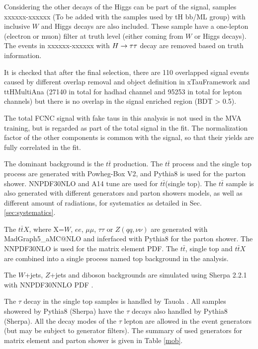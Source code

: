 Considering the other decays of the Higgs can be part of the signal, samples xxxxxx-xxxxxx (To be added with the samples used by tH bb/ML group) with inclusive $W$ and Higgs decays are also included. These sample have a one-lepton (electron or muon) filter at truth level (either coming from $W$ or Higgs decays). The events in xxxxxx-xxxxxx with $H \rightarrow \tau\tau$ decay are removed based on truth information.

It is checked that after the final selection, there are 110 overlapped signal events caused by different overlap removal and object definition in xTauFramework and ttHMultiAna (27140 in total for hadhad channel and 95253 in total for lepton channels) but there is no overlap in the signal enriched region (BDT > 0.5).

The total FCNC signal with fake taus in this analysis is not used in the MVA training, but is regarded as part of the total signal in the fit. The normalization factor of the other components is common with the signal, so that their yields are fully correlated in the fit.

The dominant background is the $t\bar{t}$ production. The $t\bar{t}$ process and the single top process are generated with Powheg-Box \cite{Powheg} V2, and Pythia8 is used for the parton shower. NNPDF30NLO \cite{NNPDF30NLO} and A14 tune \cite{A14} are used for $t\bar{t}$(single top). The $t\bar{t}$ sample is also generated with different generators and parton showers models, as well as different amount of radiations, for systematics as detailed in Sec. \ref{sec:systematics}.

The $t\bar{t}X$, where X=$W$, $ee$, $\mu\mu$, $\tau\tau$ or $Z(qq,\nu\nu)$ are generated with MadGraph5\_aMC@NLO and inferfaced with Pythia8 for the parton shower. The NNPDF30NLO \cite{NNPDF30NLO} is used for the matrix element PDF. The $t\bar{t}$, single top and $t\bar{t}X$ are combined into a single process named top background in the analysis.

The $W$+jets, $Z$+jets and diboson backgrounds are simulated using Sherpa 2.2.1 \cite{Sherpa} with NNPDF30NNLO PDF \cite{NNPDF30NLO}.

The $\tau$ decay in the single top samples is handled by Tauola \cite{Tauola}. All samples showered by Pythia8 (Sherpa) have the $\tau$ decays also handled by Pythia8 (Sherpa). All the decay modes of the $\tau$ lepton are allowed in the event generators (but may be subject to generator filters). The summary of used generators for matrix element and parton shower is given in Table \ref{mob}.

